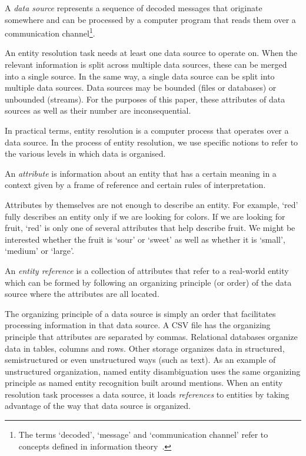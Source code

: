 \documentclass[journal]{IEEEtran}
\begin{document}
    \begin{defn}
        A \textit{data source} represents a sequence of decoded messages
        that originate somewhere and can be processed by a computer program that
        reads them over a communication channel\footnote{The terms `decoded', `message' and `communication channel' refer to concepts
        defined in information theory~\cite{ash2012it}.}.
    \end{defn}

    
    
    An entity resolution task needs at least one data source to operate on.
    When the relevant information is split across multiple data sources, these
    can be merged into a single source.
    In the same way, a single data source can be split into multiple data
    sources.
    Data sources may be bounded (files or databases) or unbounded (streams).
    For the purposes of this paper, these attributes of data sources as well as
    their number are inconsequential.
    
    In practical terms, entity resolution is a computer process that operates
    over a data source.
    In the process of entity resolution, we use specific notions to refer to the
    various levels in which data is organised.

    \begin{defn}
        An \textit{attribute} is information about an entity that has a certain
        meaning in a context given by a frame of reference and certain rules of
        interpretation.
    \end{defn}

    Attributes by themselves are not enough to describe an entity.
    For example, `red' fully describes an entity only if we are looking for
    colors.
    If we are looking for fruit, `red' is only one of several attributes that
    help describe fruit.
    We might be interested whether the fruit is `sour' or `sweet' as well as
    whether it is `small', `medium' or `large'.

    \begin{defn}
        An \textit{entity reference} is a collection of attributes that refer
        to a real-world entity which can be formed by following an organizing
        principle (or order) of the data source where the attributes are all
        located.
    \end{defn}

    The organizing principle of a data source is simply an order that
    facilitates processing information in that data source.
    A CSV file has the organizing principle that attributes are separated by
    commas.
    Relational databases organize data in tables, columns and rows.
    Other storage organizes data in structured, semistructured or even
    unstructured ways (such as text).
    As an example of unstructured organization, named entity disambiguation uses
    the same organizing principle as named entity recognition built around
    mentions.
    When an entity resolution task processes a data source, it loads
    \textit{references}\cite{Ben2009Swoosh} to entities by taking advantage of
    the way that data source is organized.
\end{document}
